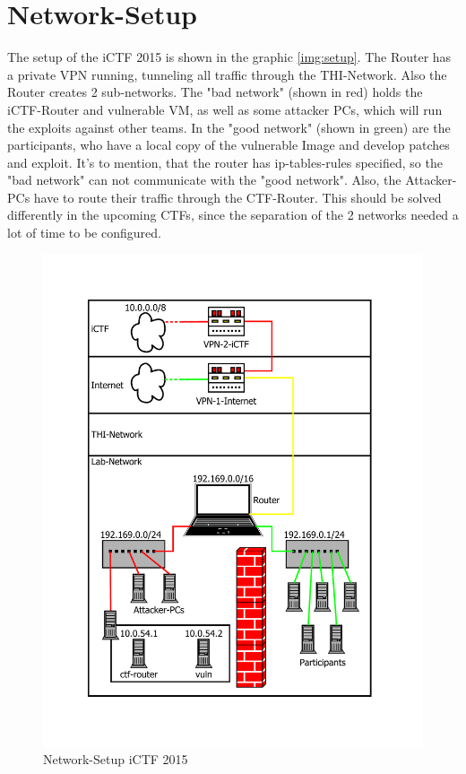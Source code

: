 	\section{Network-Setup}
	The setup of the iCTF 2015 is shown in the graphic \ref{img:setup}. The Router has a private VPN running, tunneling all traffic through the THI-Network. Also the Router creates 2 sub-networks. The "bad network" (shown in red) holds the iCTF-Router and vulnerable VM, as well as some attacker PCs, which will run the exploits against other teams. In the "good network" (shown in green) are the participants, who have a local copy of the vulnerable Image and develop patches and exploit. It's to mention, that the router has ip-tables-rules specified, so the "bad network" can not communicate with the "good network". Also, the Attacker-PCs have to route their traffic through the CTF-Router. This should be solved differently in the upcoming CTFs, since the separation of the 2 networks needed a lot of time to be configured.
	\begin{figure}
		\includegraphics[width=\textwidth]{images/setup.pdf}
		\caption{Network-Setup iCTF 2015}
	\end{figure}
	\label{img:setup}